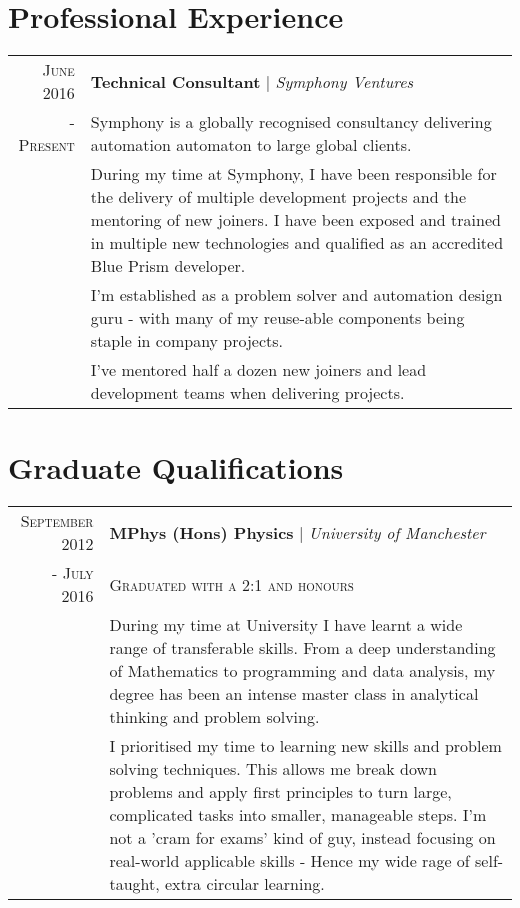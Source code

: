 \documentclass[a4paper,11pt]{article}
\begin{document}
\section{Professional Experience}

\begin{tabular}{r|p{12.5cm}}  
    \textsc{June 2016} 
        & \textbf{Technical Consultant} | \emph{Symphony Ventures}\\ 
    \textsc{- Present}
        & \footnotesize{Symphony is a globally recognised consultancy delivering automation automaton to large global clients.} \\
        & \footnotesize{During my time at Symphony, I have been responsible for the delivery of multiple development projects and the mentoring of new joiners. I have been exposed and trained in multiple new technologies and qualified as an accredited Blue Prism developer.} \\
        & \footnotesize{I'm established as a problem solver and automation design guru - with many of my reuse-able components being staple in company projects.}\\
        & \footnotesize{I've mentored half a dozen new joiners and lead development teams when delivering projects.} \\
\end{tabular}



\section{Graduate Qualifications}
\begin{tabular}{r|p{12.5cm}}  
    \textsc{September 2012} 
        & \textbf{MPhys (Hons) Physics} | \emph{University of Manchester}\\ 
    \textsc{- July 2016}
        &\footnotesize{\textsc{Graduated with a 2:1 and honours}}\\
        & \footnotesize{During my time at University I have learnt a wide range of transferable skills. From a deep understanding of Mathematics to programming and data analysis, my degree has been an intense master class in analytical thinking and problem solving.} \\
        & \footnotesize{I prioritised my time to learning new skills and problem solving techniques. This allows me break down problems and apply first principles to turn large, complicated tasks into smaller, manageable steps. I'm not a 'cram for exams' kind of guy, instead focusing on real-world applicable skills - Hence my wide rage of self-taught, extra circular learning.} \\

\end{tabular}
\end{document}
